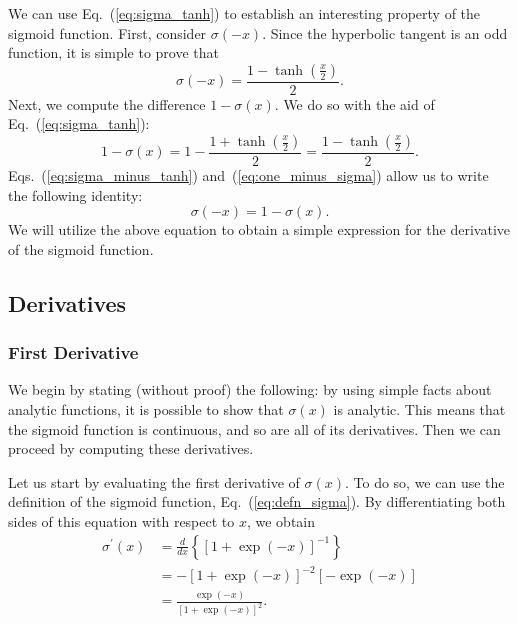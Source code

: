 \documentclass[10pt,american]{scrartcl}
\begin{document}
We can use Eq.~(\ref{eq:sigma_tanh}) to establish an interesting property of
the sigmoid function. First, consider $\sigma\left(-x\right)$. Since the
hyperbolic tangent is an odd function, it is simple to prove that
\begin{equation}
\sigma\left(-x\right)=\frac{1-\tanh\left(\frac{x}{2}\right)}{2}.
\label{eq:sigma_minus_tanh}
\end{equation}
Next, we compute the difference $1-\sigma\left(x\right)$. We do so with the
aid of Eq.~(\ref{eq:sigma_tanh}):
\begin{equation}
1-\sigma\left(x\right)=1-\frac{1+\tanh\left(\frac{x}{2}\right)}{2}=\frac{1-\tanh\left(\frac{x}{2}\right)}{2}.
\label{eq:one_minus_sigma}
\end{equation}
Eqs.~(\ref{eq:sigma_minus_tanh}) and~(\ref{eq:one_minus_sigma}) allow us to
write the following identity:
\begin{equation}
\sigma\left(-x\right)=1-\sigma\left(x\right).
\label{eq:sigma_minus}
\end{equation}
We will utilize the above equation to obtain a simple expression for the
derivative of the sigmoid function.

\subsection*{Derivatives}

\subsubsection*{First Derivative}

We begin by stating (without proof) the following: by using simple facts about
analytic functions, it is possible to show that $\sigma\left(x\right)$ is
analytic. This means that the sigmoid function is continuous, and so are all
of its derivatives. Then we can proceed by computing these derivatives.

Let us start by evaluating the first derivative of $\sigma\left(x\right)$. To
do so, we can use the definition of the sigmoid function,
Eq.~(\ref{eq:defn_sigma}). By differentiating both sides of this equation with
respect to $x$, we obtain
\begin{align}
\nonumber\sigma^{\prime}\left(x\right)&=\frac{d}{dx}\left\{\left[1+\exp\left(-x\right)\right]^{-1}\right\}\\
\nonumber&=-\left[1+\exp\left(-x\right)\right]^{-2}\left[-\exp\left(-x\right)\right]\\
&=\frac{\exp\left(-x\right)}{\left[1+\exp\left(-x\right)\right]^{2}}.
\label{eq:sigma_prime_1}
\end{align}
\end{document}
